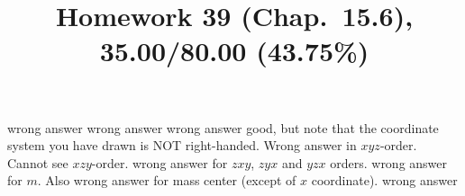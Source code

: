 \documentclass[pstricks,10pt,dvipsnames]{article} %
\title{Homework 39 (Chap.~15.6),
35.00/80.00 (43.75\%)
}
\begin{document}
\maketitle
{}
wrong answer
wrong answer
wrong answer
good, but note that the coordinate system you have drawn is NOT right-handed.
Wrong answer in $xyz$-order. Cannot see $xzy$-order.
wrong answer for $zxy$, $zyx$ and $yzx$ orders.
wrong answer for $m$. Also wrong answer for mass center (except of $x$ coordinate). 
wrong answer
\end{document}
